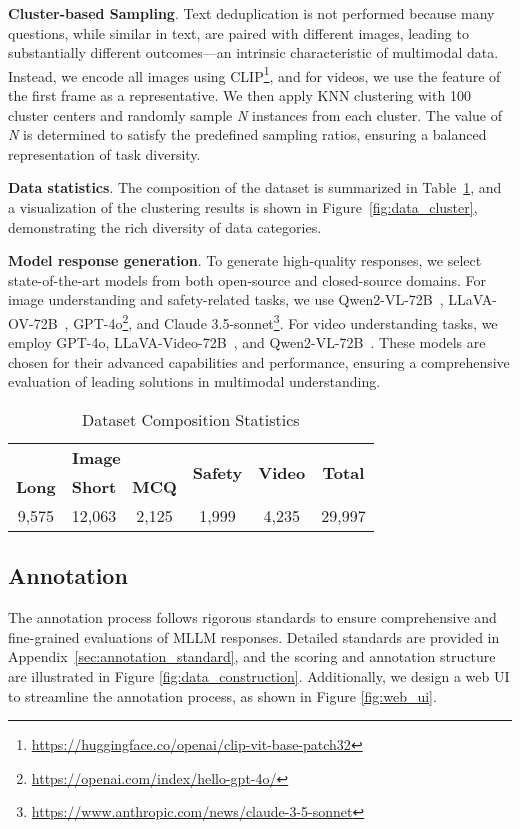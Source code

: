 \textbf{Cluster-based Sampling}.
Text deduplication is not performed because many questions, while similar in text, are paired with different images, leading to substantially different outcomes—an intrinsic characteristic of multimodal data. Instead, we encode all images using CLIP\footnote{\url{https://huggingface.co/openai/clip-vit-base-patch32}}, and for videos, we use the feature of the first frame as a representative. We then apply KNN clustering with 100 cluster centers and randomly sample \textit{N} instances from each cluster. The value of \textit{N} is determined to satisfy the predefined sampling ratios, ensuring a balanced representation of task diversity.

\textbf{Data statistics}.
The composition of the dataset is summarized in Table~\ref{tab:data_statistics}, and a visualization of the clustering results is shown in Figure~\ref{fig:data_cluster}, demonstrating the rich diversity of data categories.

\textbf{Model response generation}.
To generate high-quality responses, we select state-of-the-art models from both open-source and closed-source domains. For image understanding and safety-related tasks, we use Qwen2-VL-72B~\cite{wang2024qwen2}, LLaVA-OV-72B~\cite{li2024llava}, GPT-4o\footnote{\url{https://openai.com/index/hello-gpt-4o/}}, and Claude 3.5-sonnet\footnote{\url{https://www.anthropic.com/news/claude-3-5-sonnet}}. For video understanding tasks, we employ GPT-4o, LLaVA-Video-72B~\cite{zhang2024video}, and Qwen2-VL-72B~\cite{wang2024qwen2}. These models are chosen for their advanced capabilities and performance, ensuring a comprehensive evaluation of leading solutions in multimodal understanding.

\begin{table}[]
\caption{Dataset Composition Statistics}
\label{tab:data_statistics}
\centering
\begin{tabular}{cccccc}
\toprule
\multicolumn{3}{c}{\textbf{Image}} & \multirow{2}{*}{\textbf{Safety}} & \multirow{2}{*}{\textbf{Video}} & \multirow{2}{*}{\textbf{Total}} \\ \cmidrule{1-3}
\textbf{Long} & \textbf{Short} & \textbf{MCQ} &  &  &  \\ \hline
9,575 & 12,063 & 2,125 & 1,999 & 4,235 & 29,997 \\ \bottomrule
\end{tabular}%
\end{table}

\subsection{Annotation}
The annotation process follows rigorous standards to ensure comprehensive and fine-grained evaluations of MLLM responses. Detailed standards are provided in Appendix~\ref{sec:annotation_standard}, and the scoring and annotation structure are illustrated in Figure \ref{fig:data_construction}. Additionally, we design a web UI to streamline the annotation process, as shown in Figure \ref{fig:web_ui}.

